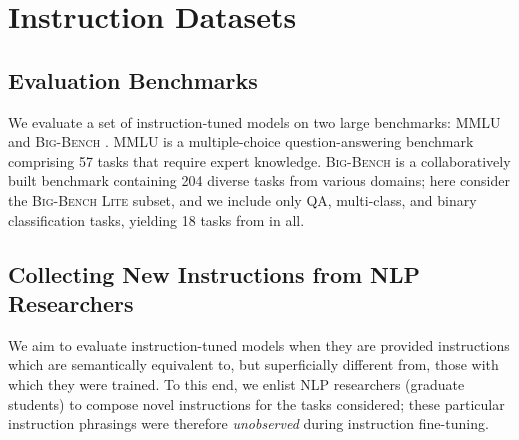 \section{Instruction Datasets}

\subsection{Evaluation Benchmarks}

We evaluate a set of instruction-tuned models on two large benchmarks: \textsc{MMLU} \cite{hendrycks2020measuring} and \textsc{Big-Bench} \cite{srivastava2022beyond}. \textsc{MMLU} is a multiple-choice question-answering benchmark comprising 57 tasks that require expert knowledge.
\textsc{Big-Bench} is a collaboratively built benchmark containing 204 diverse tasks from various domains; here %
consider the \textsc{Big-Bench Lite} subset, and we include only QA, multi-class, and binary classification tasks, yielding 18 tasks from in all. %


\subsection{Collecting New Instructions from NLP Researchers}
\label{section:new-instructions}

We aim to evaluate instruction-tuned models when they are provided instructions which are semantically equivalent to, but superficially different from, those with which they were trained.
To this end, we enlist NLP researchers (graduate students) to compose novel instructions for the tasks considered; these particular instruction phrasings were therefore \emph{unobserved} during instruction fine-tuning. 




